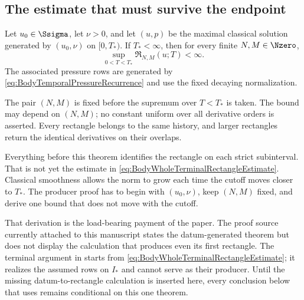 \subsection{The estimate that must survive the endpoint}\label{sub:BodyCompatibleIntersection}

\begin{theorem}\label{thm:BodyWholeTerminalRectangleTheorem}
Let \(u_0\in\Ssigma\), let \(\nu>0\), and let \((u,p)\) be the maximal classical
solution generated by \((u_0,\nu)\) on \([0,T_*)\).  If \(T_*<\infty\), then for every
finite \(N,M\in\Nzero\),
\begin{equation}\label{eq:BodyWholeTerminalRectangleEstimate}
  \sup_{0<T<T_*}\mathfrak R_{N,M}(u;T)<\infty.
\end{equation}
The associated pressure rows are generated by
\eqref{eq:BodyTemporalPressureRecurrence} and use the fixed decaying normalization.
\end{theorem}

\begin{remark}
The pair \((N,M)\) is fixed before the supremum over \(T<T_*\) is taken.
The bound may depend on \((N,M)\); no constant uniform over all derivative orders is asserted.
Every rectangle belongs to the same history, and larger rectangles return the identical derivatives on their overlaps.
\end{remark}

Everything before this theorem identifies the rectangle on each strict
subinterval.  That is not yet the estimate in
\eqref{eq:BodyWholeTerminalRectangleEstimate}.  Classical smoothness allows the
norm to grow each time the cutoff moves closer to \(T_*\).  The producer proof
has to begin with \((u_0,\nu)\), keep \((N,M)\) fixed, and derive one bound that
does not move with the cutoff.

That derivation is the load-bearing payment of the paper.  The proof source
currently attached to this manuscript states the datum-generated theorem but
does not display the calculation that produces even its first rectangle.  The
terminal argument in 
starts from \eqref{eq:BodyWholeTerminalRectangleEstimate}; it realizes the
assumed rows on \(I_*\) and cannot serve as their producer.  Until the missing
datum-to-rectangle calculation is inserted here, every conclusion below that
uses  remains conditional on this
one theorem.


